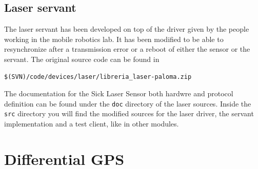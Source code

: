 \subsection{Laser servant}
The laser servant has been developed on top of the driver given by the people working in the mobile robotics lab. It has been modified to be able to resynchronize after a transmission error or a reboot of either the sensor or the servant. The original source code can be found in
\begin{verbatim}
$(SVN)/code/devices/laser/libreria_laser-paloma.zip
\end{verbatim}
The documentation for the Sick Laser Sensor both hardwre and protocol definition can be found under the \texttt{doc} directory of the laser sources. Inside the \texttt{src} directory you will find the modified sources for the laser driver, the servant implementation and a test client, like in other modules.



\section{Differential GPS}
\label{sec:devmanual_gps}

